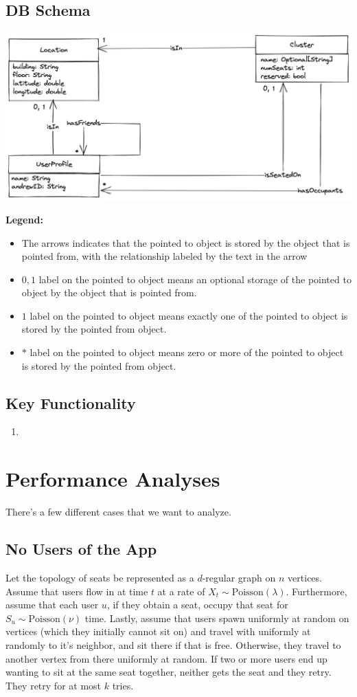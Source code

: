 \documentclass[11pt]{article}
\begin{document}
  \subsection{DB Schema}
  \begin{center}
    \includegraphics[scale=0.2]{CMUSeats DB Schema.png}
  \end{center}
  \textbf{Legend:} 
  \begin{itemize}
    \item The arrows indicates that the pointed to object is stored by the object that is pointed from, with the relationship labeled by the text in the arrow
    \item \(0, 1\) label on the pointed to object means an optional storage of the pointed to object by the object that is pointed from.
    \item \(1\) label on the pointed to object means exactly one of the pointed to object is stored by the pointed from object.
    \item \(*\) label on the pointed to object means zero or more of the pointed to object is stored by the pointed from object. 
  \end{itemize}
  \subsection{Key Functionality}
  \begin{enumerate}
    \item 
  \end{enumerate}
  \newpage
  \section{Performance Analyses}
  There's a few different cases that we want to analyze. 
  \subsection{No Users of the App}
  Let the topology of seats be represented as a \(d\)-regular graph on \(n\) vertices. Assume that users flow in at time \(t\) at a rate of \(X_t \sim \text{Poisson}(\lambda)\). Furthermore, assume that each user \(u\), if they obtain a seat, occupy that seat for \(S_u \sim \text{Poisson}(\nu)\) time. Lastly, assume that users spawn uniformly at random on vertices (which they initially cannot sit on) and travel with uniformly at randomly to it's neighbor, and sit there if that is free. Otherwise, they travel to another vertex from there uniformly at random. If two or more users end up wanting to sit at the same seat together, neither gets the seat and they retry. They retry for at most \(k\) tries. 
\end{document}
